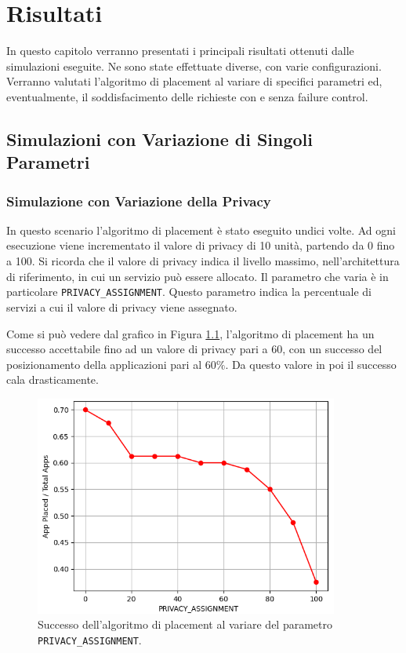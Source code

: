 \chapter{Risultati}

In questo capitolo verranno presentati i principali risultati ottenuti dalle simulazioni eseguite. Ne sono state effettuate diverse, con varie configurazioni. Verranno valutati l'algoritmo di placement al variare di specifici parametri ed, eventualmente, il soddisfacimento delle richieste con e senza failure control.

\section{Simulazioni con Variazione di Singoli Parametri}

\subsection{Simulazione con Variazione della Privacy}

In questo scenario l'algoritmo di placement è stato eseguito undici volte. Ad ogni esecuzione viene incrementato il valore di privacy di 10 unità, partendo da 0 fino a 100. Si ricorda che il valore di privacy indica il livello massimo, nell'architettura di riferimento, in cui un servizio può essere allocato. Il parametro che varia è in particolare \texttt{PRIVACY\_ASSIGNMENT}. Questo parametro indica la percentuale di servizi a cui il valore di privacy viene assegnato.

Come si può vedere dal grafico in Figura \ref{fig:privacy_placement_success}, l'algoritmo di placement ha un successo accettabile fino ad un valore di privacy pari a 60, con un successo del posizionamento della applicazioni pari al $60\%$. Da questo valore in poi il successo cala drasticamente.

\begin{figure}[!ht]
  \includegraphics[width=10cm]{images/privacy_placement_success}
  \centering
  \caption{Successo dell'algoritmo di placement al variare del parametro \texttt{PRIVACY\_ASSIGNMENT}.}
  \label{fig:privacy_placement_success}
\end{figure}

